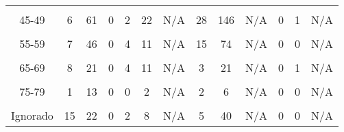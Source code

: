 {\begin{tabular}[t]{ccccccccccccc}
		\cellcolor[HTML]{B6B3FF}{40-44} & \cellcolor[HTML]{B6B3FF}{17} & \cellcolor[HTML]{B6B3FF}{82} & \cellcolor[HTML]{B6B3FF}{0} & \cellcolor[HTML]{B6B3FF}{6} & \cellcolor[HTML]{B6B3FF}{36} & \cellcolor[HTML]{B6B3FF}{N/A} & \cellcolor[HTML]{B6B3FF}{30} & \cellcolor[HTML]{B6B3FF}{230} & \cellcolor[HTML]{B6B3FF}{N/A} & \cellcolor[HTML]{B6B3FF}{0} & \cellcolor[HTML]{B6B3FF}{1} & \cellcolor[HTML]{B6B3FF}{N/A}\\
		45-49 & 6 & 61 & 0 & 2 & 22 & N/A & 28 & 146 & N/A & 0 & 1 & N/A\\
		\cellcolor[HTML]{B6B3FF}{50-54} & \cellcolor[HTML]{B6B3FF}{8} & \cellcolor[HTML]{B6B3FF}{58} & \cellcolor[HTML]{B6B3FF}{0} & \cellcolor[HTML]{B6B3FF}{4} & \cellcolor[HTML]{B6B3FF}{16} & \cellcolor[HTML]{B6B3FF}{N/A} & \cellcolor[HTML]{B6B3FF}{22} & \cellcolor[HTML]{B6B3FF}{108} & \cellcolor[HTML]{B6B3FF}{N/A} & \cellcolor[HTML]{B6B3FF}{0} & \cellcolor[HTML]{B6B3FF}{0} & \cellcolor[HTML]{B6B3FF}{N/A}\\
		55-59 & 7 & 46 & 0 & 4 & 11 & N/A & 15 & 74 & N/A & 0 & 0 & N/A\\
		\cellcolor[HTML]{B6B3FF}{60-64} & \cellcolor[HTML]{B6B3FF}{7} & \cellcolor[HTML]{B6B3FF}{46} & \cellcolor[HTML]{B6B3FF}{0} & \cellcolor[HTML]{B6B3FF}{2} & \cellcolor[HTML]{B6B3FF}{10} & \cellcolor[HTML]{B6B3FF}{N/A} & \cellcolor[HTML]{B6B3FF}{9} & \cellcolor[HTML]{B6B3FF}{38} & \cellcolor[HTML]{B6B3FF}{N/A} & \cellcolor[HTML]{B6B3FF}{0} & \cellcolor[HTML]{B6B3FF}{1} & \cellcolor[HTML]{B6B3FF}{N/A}\\
		65-69 & 8 & 21 & 0 & 4 & 11 & N/A & 3 & 21 & N/A & 0 & 1 & N/A\\
		\cellcolor[HTML]{B6B3FF}{70-74} & \cellcolor[HTML]{B6B3FF}{4} & \cellcolor[HTML]{B6B3FF}{15} & \cellcolor[HTML]{B6B3FF}{0} & \cellcolor[HTML]{B6B3FF}{4} & \cellcolor[HTML]{B6B3FF}{9} & \cellcolor[HTML]{B6B3FF}{N/A} & \cellcolor[HTML]{B6B3FF}{0} & \cellcolor[HTML]{B6B3FF}{22} & \cellcolor[HTML]{B6B3FF}{N/A} & \cellcolor[HTML]{B6B3FF}{0} & \cellcolor[HTML]{B6B3FF}{0} & \cellcolor[HTML]{B6B3FF}{N/A}\\
		75-79 & 1 & 13 & 0 & 0 & 2 & N/A & 2 & 6 & N/A & 0 & 0 & N/A\\
		\cellcolor[HTML]{B6B3FF}{80 y más} & \cellcolor[HTML]{B6B3FF}{2} & \cellcolor[HTML]{B6B3FF}{11} & \cellcolor[HTML]{B6B3FF}{0} & \cellcolor[HTML]{B6B3FF}{2} & \cellcolor[HTML]{B6B3FF}{0} & \cellcolor[HTML]{B6B3FF}{N/A} & \cellcolor[HTML]{B6B3FF}{0} & \cellcolor[HTML]{B6B3FF}{3} & \cellcolor[HTML]{B6B3FF}{N/A} & \cellcolor[HTML]{B6B3FF}{0} & \cellcolor[HTML]{B6B3FF}{1} & \cellcolor[HTML]{B6B3FF}{N/A}\\
		Ignorado & 15 & 22 & 0 & 2 & 8 & N/A & 5 & 40 & N/A & 0 & 0 & N/A\\
		\bottomrule
\end{tabular}}

